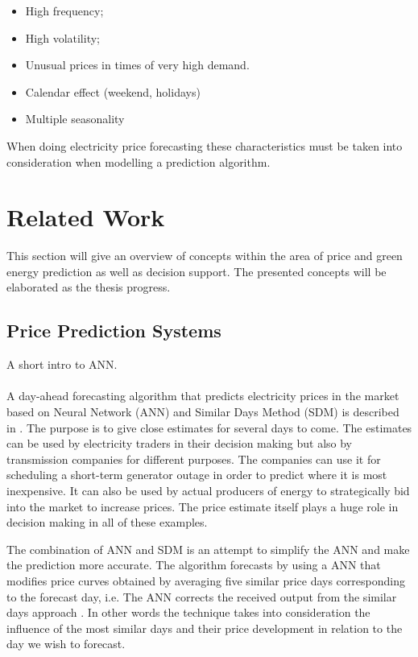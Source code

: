 \documentclass[twoside,11pt,openright]{report}
\begin{document}
\begin{itemize}
\item High frequency;
\item High volatility;
\item Unusual prices in times of very high demand.
\item Calendar effect (weekend, holidays)
\item Multiple seasonality
\end{itemize}
When doing electricity price forecasting these characteristics must be taken into consideration when modelling a prediction algorithm. 
\section{Related Work}
This section will give an overview of concepts within the area of price and green energy prediction as well as decision support. The presented concepts will be elaborated as the thesis progress.

\subsection{Price Prediction Systems}
A short intro to ANN.
\\[0.5cm]

\\[0.5cm]
A day-ahead forecasting algorithm that predicts electricity prices in the market based on Neural Network (ANN) and Similar Days Method (SDM) is described in \cite{pjmForecast}. The purpose is to give close estimates for several days to come. The estimates can be used by electricity traders in their decision making but also by transmission companies for different purposes. The companies can use it for scheduling a short-term generator outage in order to predict where it is most inexpensive. It can also be used by actual producers of energy to strategically bid into the market to increase prices. The price estimate itself plays a huge role in decision making in all of these examples.

The combination of ANN and SDM is an attempt to simplify the ANN and make the prediction more accurate. The algorithm forecasts by using a ANN that modifies price curves obtained by averaging five similar price days corresponding to the forecast day, i.e. The ANN corrects the received output from the similar days approach \cite{pjmForecast}. In other words the technique takes into consideration the influence of the most similar days and their price development in relation to the day we wish to forecast.
\end{document}
